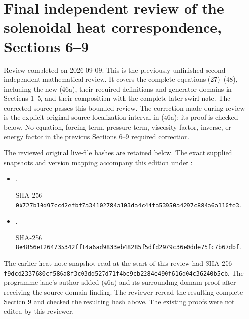 \section*{Final independent review of the solenoidal heat correspondence, Sections 6--9}

Review completed on 2026-09-09. This is the previously unfinished second independent mathematical review. It covers the complete equations (27)--(48), including the new (46a), their required definitions and generator domains in Sections 1--5, and their composition with the complete later swirl note. The corrected source passes this bounded review. The correction made during review is the explicit original-source localization interval in (46a); its proof is checked below. No equation, forcing term, pressure term, viscosity factor, inverse, or energy factor in the previous Sections 6--9 required correction.

The reviewed original live-file hashes are retained below. The exact supplied snapshots and version mapping accompany this edition under :

\begin{itemize}
\tightlist
\item
  .\par
  SHA-256 \texttt{0b727b10\allowbreak{}d97ccd2e\allowbreak{}fbf7a341\allowbreak{}02784a10\allowbreak{}3da4c44f\allowbreak{}a53950a4\allowbreak{}297c884a\allowbreak{}6a110fe3}.
\item
  .\par
  SHA-256 \texttt{8e4856e1\allowbreak{}26473534\allowbreak{}2ff14a6a\allowbreak{}d9833eb4\allowbreak{}8285f5df\allowbreak{}d2979c36\allowbreak{}e0dde75f\allowbreak{}c7b67dbf}.
\end{itemize}

The earlier heat-note snapshot read at the start of this review had SHA-256 \texttt{f9dcd233\allowbreak{}7680cf58\allowbreak{}6a8f3c03\allowbreak{}dd527d71\allowbreak{}f4bc9cb2\allowbreak{}284e490f\allowbreak{}616d04c3\allowbreak{}6240b5cb}. The programme lane's author added (46a) and its surrounding domain proof after receiving the source-domain finding. The reviewer reread the resulting complete Section 9 and checked the resulting hash above. The existing proofs were not edited by this reviewer.

